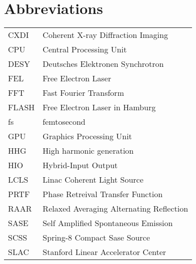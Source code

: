 \chapter*{Abbreviations}\label{sec:abrv}

\begin{tabular}{ll}
CXDI    &Coherent X-ray Diffraction Imaging\\
CPU     &Central Processing Unit\\
DESY    &Deutsches Elektronen Synchrotron\\
FEL     &Free Electron Laser\\
FFT     &Fast Fourier Transform\\
FLASH   &Free Electron Laser in Hamburg\\
fs      &femtosecond\\
GPU     &Graphics Processing Unit\\
HHG     &High harmonic generation\\
HIO     &Hybrid-Input Output\\
LCLS    &Linac Coherent Light Source\\
PRTF    &Phase Retreival Transfer Function\\
RAAR    &Relaxed Averaging Alternating Reflection\\
SASE    &Self Amplified Spontaneous Emission\\  
SCSS    &Spring-8 Compact Sase Source\\
SLAC    &Stanford Linear Accelerator Center\\

\end{tabular}
